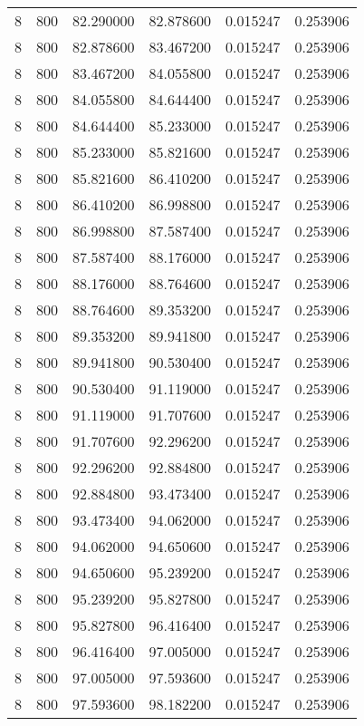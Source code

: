 \begin{longtable}{rrrrrr}
8 & 800 & 82.290000 & 82.878600 & 0.015247 & 0.253906 \\
8 & 800 & 82.878600 & 83.467200 & 0.015247 & 0.253906 \\
8 & 800 & 83.467200 & 84.055800 & 0.015247 & 0.253906 \\
8 & 800 & 84.055800 & 84.644400 & 0.015247 & 0.253906 \\
8 & 800 & 84.644400 & 85.233000 & 0.015247 & 0.253906 \\
8 & 800 & 85.233000 & 85.821600 & 0.015247 & 0.253906 \\
8 & 800 & 85.821600 & 86.410200 & 0.015247 & 0.253906 \\
8 & 800 & 86.410200 & 86.998800 & 0.015247 & 0.253906 \\
8 & 800 & 86.998800 & 87.587400 & 0.015247 & 0.253906 \\
8 & 800 & 87.587400 & 88.176000 & 0.015247 & 0.253906 \\
8 & 800 & 88.176000 & 88.764600 & 0.015247 & 0.253906 \\
8 & 800 & 88.764600 & 89.353200 & 0.015247 & 0.253906 \\
8 & 800 & 89.353200 & 89.941800 & 0.015247 & 0.253906 \\
8 & 800 & 89.941800 & 90.530400 & 0.015247 & 0.253906 \\
8 & 800 & 90.530400 & 91.119000 & 0.015247 & 0.253906 \\
8 & 800 & 91.119000 & 91.707600 & 0.015247 & 0.253906 \\
8 & 800 & 91.707600 & 92.296200 & 0.015247 & 0.253906 \\
8 & 800 & 92.296200 & 92.884800 & 0.015247 & 0.253906 \\
8 & 800 & 92.884800 & 93.473400 & 0.015247 & 0.253906 \\
8 & 800 & 93.473400 & 94.062000 & 0.015247 & 0.253906 \\
8 & 800 & 94.062000 & 94.650600 & 0.015247 & 0.253906 \\
8 & 800 & 94.650600 & 95.239200 & 0.015247 & 0.253906 \\
8 & 800 & 95.239200 & 95.827800 & 0.015247 & 0.253906 \\
8 & 800 & 95.827800 & 96.416400 & 0.015247 & 0.253906 \\
8 & 800 & 96.416400 & 97.005000 & 0.015247 & 0.253906 \\
8 & 800 & 97.005000 & 97.593600 & 0.015247 & 0.253906 \\
8 & 800 & 97.593600 & 98.182200 & 0.015247 & 0.253906 \\

\end{longtable}
